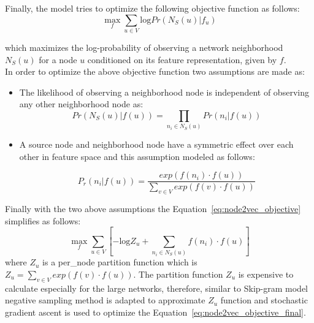 \begin{itemize}
Finally, the model tries to optimize the following objective function as follows:
\begin{equation}\label{eq:node2vec_objective}
\max_{f} \sum_{u \in V } \textrm{log} Pr(N_S(u)|f_{u})
\end{equation}

which maximizes the log-probability of observing a network neighborhood $N_S(u)$ for a node $u$ conditioned on its feature representation, given by $f$.\\
In order to optimize the above objective function two assumptions are made as:\\
\begin{itemize}
\item The likelihood of observing a neighborhood node is independent of observing any other neighborhood node as:
\begin{equation}
 Pr(N_S(u)|f(u))= \prod_{n_i \in N_S(u)}Pr(n_i|f(u))
\end{equation}
\item A source node and neighborhood node have a symmetric effect over each other in feature space and this assumption modeled as follows:

\begin{equation}
P_{r}(n_{i}|f(u))=\frac{exp(f(n_i)\cdot f(u))}{\sum\limits_{v \in V} exp(f(v)\cdot f(u))}
\end{equation}

\end{itemize}
Finally with the two above assumptions the Equation~\ref{eq:node2vec_objective} simplifies as follows:
\begin{equation}\label{eq:node2vec_objective_final}
\max_{f} \sum_{u \in V }[ -\textrm{log}Z_u + \sum_{n_i \in N_S (u) }f(n_i) \cdot f(u)]
\end{equation}
where $Z_u$ is a per\_node partition function which is $Z_u= \sum\limits_{v \in V} exp(f(v)\cdot f(u))$. The partition function $Z_u$ is expensive to calculate especially for the large networks, therefore, similar to Skip-gram model negative sampling method is adapted to approximate $Z_u$ function and stochastic gradient ascent is used to optimize the Equation~\ref{eq:node2vec_objective_final}.\\



\end{itemize}
